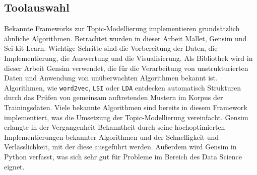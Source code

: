 \documentclass[german,version-2020-11]{uzl-thesis}
\begin{document}
\begin{itemize}
\section{Toolauswahl}
Bekannte Frameworks zur Topic-Modellierung implementieren grundsätzlich ähnliche Algorithmen. Betrachtet wurden in dieser Arbeit Mallet, Gensim und Sci-kit Learn.  Wichtige Schritte sind die Vorbereitung der Daten, die Implementierung, die Auswertung und die Visualisierung. Als Bibliothek wird in dieser Arbeit Gensim verwendet, die für die Verarbeitung von unstrukturierten Daten und Anwendung von unüberwachten Algorithmen bekannt ist. Algorithmen, wie \lstinline{word2vec}, \lstinline{LSI} oder \lstinline{LDA} entdecken automatisch Strukturen durch das Prüfen von gemeinsam auftretenden Mustern im Korpus der Trainingsdaten. Viele bekannte Algorithmen sind bereits in diesem Framework implementiert, was die Umsetzung der Topic-Modellierung vereinfacht. Gensim erlangte in der Vergangenheit Bekanntheit durch seine hochoptimierten Implementierungen bekannter Algorithmen und der Schnelligkeit und Verlässlichkeit, mit der diese ausgeführt werden. Außerdem wird Gensim in Python verfasst, was sich sehr gut für Probleme im Bereich des Data Science eignet. 



\end{itemize}
\end{document}
